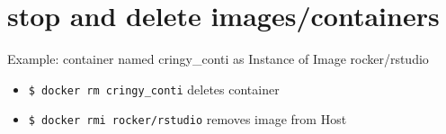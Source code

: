 \documentclass[]{scrartcl}
\begin{document}
\section{stop and delete images/containers}
\begin{mybox}
	Example: container named cringy\_conti as Instance of Image rocker/rstudio
	\begin{itemize}
		\item \texttt{\$ docker rm cringy\_conti} 
		\subitem deletes container
		\item \texttt{\$ docker rmi rocker/rstudio}
		\subitem removes image from Host
	\end{itemize}
\end{mybox}
\end{document}
